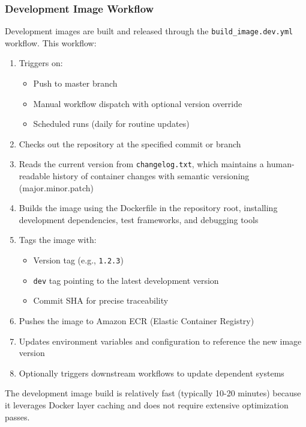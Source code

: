 \subsubsection{Development Image Workflow}
Development images are built and released through the \texttt{build\_image.dev.yml}
workflow. This workflow:
\begin{enumerate}
  \item Triggers on:
    \begin{itemize}
      \item Push to master branch

      \item Manual workflow dispatch with optional version override

      \item Scheduled runs (daily for routine updates)
    \end{itemize}

  \item Checks out the repository at the specified commit or branch

  \item Reads the current version from \texttt{changelog.txt}, which maintains
    a human-readable history of container changes with semantic versioning
    (major.minor.patch)

  \item Builds the image using the Dockerfile in the repository root,
    installing development dependencies, test frameworks, and
    debugging tools

  \item Tags the image with:
    \begin{itemize}
      \item Version tag (e.g., \texttt{1.2.3})

      \item \texttt{dev} tag pointing to the latest development
        version

      \item Commit SHA for precise traceability
    \end{itemize}

  \item Pushes the image to Amazon ECR (Elastic Container Registry)

  \item Updates environment variables and configuration to reference the
    new image version

  \item Optionally triggers downstream workflows to update dependent systems
\end{enumerate}
The development image build is relatively fast (typically 10-20 minutes)
because it leverages Docker layer caching and does not require
extensive optimization passes.
